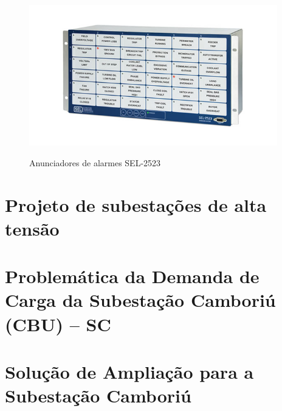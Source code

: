 \documentclass[a5paper,english,spanish,brazil]{ufsc-thesis}
\begin{document}
		\begin{figure}[htb]
		  \caption{Anunciadores de alarmes SEL-2523}
		  \centering
		  \includegraphics[width=10.8cm]{anunciador.jpg}
		  \label{fig:anunciador}
		\end{figure}




\chapter{Projeto de subestações de alta tensão}
\label{chap:projSEAT}
	\begin{mdframed}[hidealllines=true,backgroundcolor=blue!20]
	\lipsum
	\end{mdframed}


\chapter{Problemática da Demanda de Carga da Subestação Camboriú (CBU) -- SC}
\label{chap:demCarga}
	\begin{mdframed}[hidealllines=true,backgroundcolor=blue!20]
	\lipsum
	\end{mdframed}


\chapter{Solução de Ampliação para a Subestação Camboriú}
\label{chap:solAmp}
	\begin{mdframed}[hidealllines=true,backgroundcolor=blue!20]
	\lipsum
	\end{mdframed}
\end{document}
